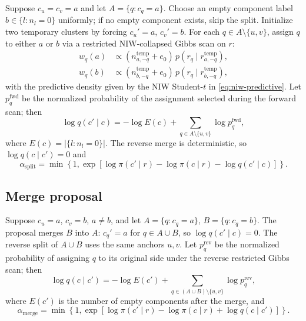 \documentclass[11pt]{article}
\begin{document}
Suppose $c_u=c_v=a$ and let $A=\{q:c_q=a\}$.  Choose an empty component
label $b\in\{l:n_l=0\}$ uniformly; if no empty component exists, skip the
split.  Initialize two temporary clusters by forcing $c_u'=a$, $c_v'=b$.
For each $q\in A\setminus\{u,v\}$, assign $q$ to either $a$ or $b$ via a
restricted NIW-collapsed Gibbs scan on $r$:
\begin{align}
    w_q(a)&\propto(n_{a,-q}^{\mathrm{temp}}+e_0)\,p(r_q\mid r_{a,-q}^{\mathrm{temp}}),\\
    w_q(b)&\propto(n_{b,-q}^{\mathrm{temp}}+e_0)\,p(r_q\mid r_{b,-q}^{\mathrm{temp}}),
\end{align}
with the predictive density given by the NIW Student-$t$ in
\eqref{eq:niw-predictive}.  Let $p_q^{\mathrm{fwd}}$ be the normalized
probability of the assignment selected during the forward scan; then
\begin{equation}
    \log q(c'\mid c)
    =-\log E(c)+\sum_{q\in A\setminus\{u,v\}}\log p_q^{\mathrm{fwd}},
    \label{eq:split-forward-probability}
\end{equation}
where $E(c)=|\{l:n_l=0\}|$.  The reverse merge is deterministic, so
$\log q(c\mid c')=0$ and
\begin{equation}
    \alpha_{\mathrm{split}}
    =\min\!\left\{1,\exp[\log\pi(c'\mid r)-\log\pi(c\mid r)-\log q(c'\mid c)]\right\}.
    \label{eq:split-acceptance}
\end{equation}

\subsection{Merge proposal}

Suppose $c_u=a$, $c_v=b$, $a\neq b$, and let $A=\{q:c_q=a\}$,
$B=\{q:c_q=b\}$.  The proposal merges $B$ into $A$:
$c_q'=a$ for $q\in A\cup B$, so $\log q(c'\mid c)=0$.  The reverse split
of $A\cup B$ uses the same anchors $u,v$.  Let $p_q^{\mathrm{rev}}$ be the
normalized probability of assigning $q$ to its original side under the
reverse restricted Gibbs scan; then
\begin{equation}
    \log q(c\mid c')
    =-\log E(c')+\sum_{q\in(A\cup B)\setminus\{u,v\}}\log p_q^{\mathrm{rev}},
    \label{eq:merge-reverse-probability}
\end{equation}
where $E(c')$ is the number of empty components after the merge, and
\begin{equation}
    \alpha_{\mathrm{merge}}
    =\min\!\left\{1,\exp[\log\pi(c'\mid r)-\log\pi(c\mid r)+\log q(c\mid c')]\right\}.
    \label{eq:merge-acceptance}
\end{equation}
\end{document}

